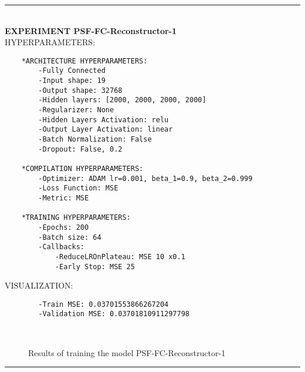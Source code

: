 \rule{0.5\textwidth}{0.5pt}\\

	{\large \textbf{EXPERIMENT PSF-FC-Reconstructor-1}}\\
	
	{\normalsize HYPERPARAMETERS:}
	\begin{lstlisting}
	*ARCHITECTURE HYPERPARAMETERS:
		-Fully Connected
		-Input shape: 19
		-Output shape: 32768
		-Hidden layers: [2000, 2000, 2000, 2000]
		-Regularizer: None
		-Hidden Layers Activation: relu
		-Output Layer Activation: linear
		-Batch Normalization: False
		-Dropout: False, 0.2
	
	*COMPILATION HYPERPARAMETERS:
		-Optimizer: ADAM lr=0.001, beta_1=0.9, beta_2=0.999
		-Loss Function: MSE
		-Metric: MSE
	
	*TRAINING HYPERPARAMETERS:
		-Epochs: 200
		-Batch size: 64
		-Callbacks: 
			-ReduceLROnPlateau: MSE 10 x0.1
			-Early Stop: MSE 25
	\end{lstlisting}
	
	{\normalsize VISUALIZATION:}
	\begin{lstlisting}
        -Train MSE: 0.03701553866267204
        -Validation MSE: 0.03701810911297798
	\end{lstlisting}
	
	\begin{figure*}[ht!]
		\hspace{\fill}
		\hspace{\fill}	
		\\
		\caption{Results of training the model PSF-FC-Reconstructor-1}
	\end{figure*}
	
\FloatBarrier	
\rule{0.5\textwidth}{0.5pt}\\